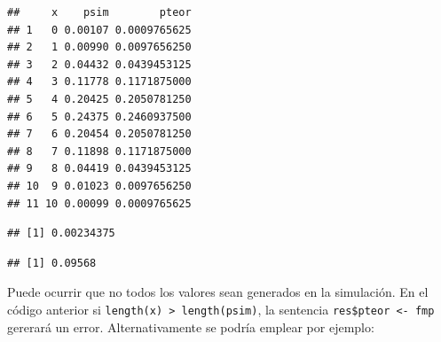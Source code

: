 \documentclass[]{book}
\newenvironment{Shaded}{\begin{snugshade}}{\end{snugshade}}
\newcommand{\KeywordTok}[1]{\textcolor[rgb]{0.13,0.29,0.53}{\textbf{#1}}}
\newcommand{\StringTok}[1]{\textcolor[rgb]{0.31,0.60,0.02}{#1}}
\newcommand{\CommentTok}[1]{\textcolor[rgb]{0.56,0.35,0.01}{\textit{#1}}}
\newcommand{\OperatorTok}[1]{\textcolor[rgb]{0.81,0.36,0.00}{\textbf{#1}}}
\newcommand{\NormalTok}[1]{#1}
\theoremstyle{definition}
\theoremstyle{definition}
\theoremstyle{definition}
\theoremstyle{remark}
\let\BeginKnitrBlock\begin \let\EndKnitrBlock\end
\begin{document}
\begin{Shaded}
\end{Shaded}

\begin{verbatim}
##     x    psim        pteor
## 1   0 0.00107 0.0009765625
## 2   1 0.00990 0.0097656250
## 3   2 0.04432 0.0439453125
## 4   3 0.11778 0.1171875000
## 5   4 0.20425 0.2050781250
## 6   5 0.24375 0.2460937500
## 7   6 0.20454 0.2050781250
## 8   7 0.11898 0.1171875000
## 9   8 0.04419 0.0439453125
## 10  9 0.01023 0.0097656250
## 11 10 0.00099 0.0009765625
\end{verbatim}

\begin{Shaded}
\end{Shaded}

\begin{verbatim}
## [1] 0.00234375
\end{verbatim}

\begin{Shaded}
\end{Shaded}

\begin{verbatim}
## [1] 0.09568
\end{verbatim}

\BeginKnitrBlock{remark}
{}Puede ocurrir que no todos los valores sean
generados en la simulación. En el código anterior si
\texttt{length(x)\ \textgreater{}\ length(psim)}, la sentencia
\texttt{res\$pteor\ \textless{}-\ fmp} gererará un error.
Alternativamente se podría emplear por ejemplo:
\EndKnitrBlock{remark}
\end{document}
